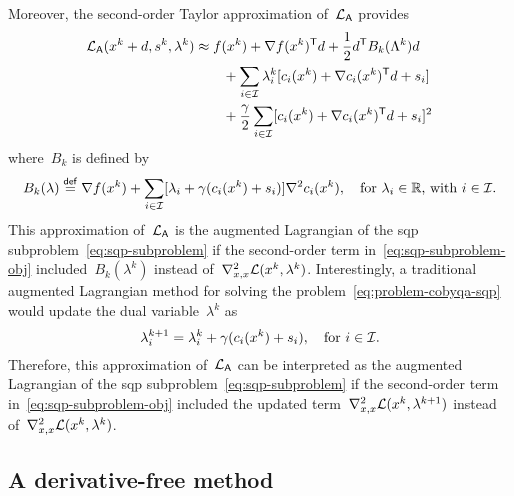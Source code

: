 Moreover, the second-order Taylor approximation of~$\lag[\mathsf{A}]$ provides
\begin{align*}
    \lag[\mathsf{A}](\iter[k] + d, s^k, \lambda^k)   & \approx \obj(\iter[k]) + \nabla \obj(\iter[k])^{\T} d + \frac{1}{2} d^{\T} B_k(\Lambda^k) d\\
                                                & \qquad + \sum_{i \in \iub} \lambda_i^k [\con{i}(\iter[k]) + \nabla \con{i}(\iter[k])^{\T} d + s_i]\\
                                                & \qquad + \frac{\gamma}{2} \sum_{i \in \iub} [\con{i}(\iter[k]) + \nabla \con{i}(\iter[k])^{\T} d + s_i]^2\\
\end{align*}
where~$B_k$ is defined by
\begin{equation*}
    B_k(\lambda) \eqdef \nabla \obj(\iter[k]) + \sum_{i \in \iub} [\lambda_i + \gamma (\con{i}(\iter[k]) + s_i)] \nabla^2 \con{i}(\iter[k]), \quad \text{for~$\lambda_i \in \R$, with~$i \in \iub$.}
\end{equation*}
This approximation of~$\lag[\mathsf{A}]$ is the augmented Lagrangian of the \gls{sqp} subproblem~\cref{eq:sqp-subproblem} if the second-order term in~\cref{eq:sqp-subproblem-obj} included~$B_k(\lambda^k)$ instead of~$\nabla_{x, x}^2 \lag(\iter[k], \lambda^k)$.
Interestingly, a traditional augmented Lagrangian method for solving the problem~\cref{eq:problem-cobyqa-sqp} would update the dual variable~$\lambda^k$ as
\begin{equation*}
    \lambda_i^{k + 1} = \lambda_i^k + \gamma (\con{i}(\iter[k]) + s_i), \quad \text{for~$i \in \iub$}.
\end{equation*}
Therefore, this approximation of~$\lag[\mathsf{A}]$ can be interpreted as the augmented Lagrangian of the \gls{sqp} subproblem~\cref{eq:sqp-subproblem} if the second-order term in~\cref{eq:sqp-subproblem-obj} included the updated term~$\nabla_{x, x}^2 \lag(\iter[k], \lambda^{k + 1})$ instead of~$\nabla_{x, x}^2 \lag(\iter[k], \lambda^k)$.

\subsection{A derivative-free  method}
\label{subsec:derivative-free-sqp}


